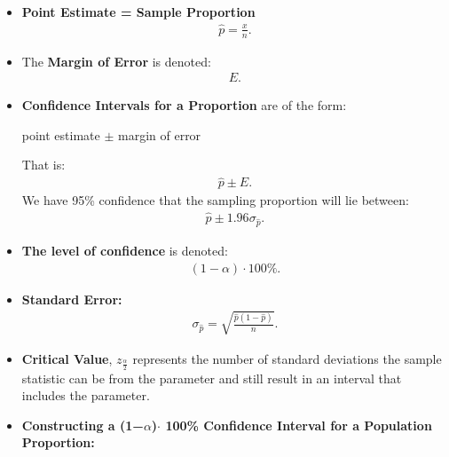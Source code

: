 \documentclass{report}
\begin{document}
    \begin{itemize}
        \item \textbf{Point Estimate = Sample Proportion}
            \begin{align*}
                \hat{p} = \frac{x}{n}
            .\end{align*}
        \item The \textbf{Margin of Error} is denoted:
            \begin{align*}
                E 
            .\end{align*}
        \item \textbf{Confidence Intervals for a Proportion} are of the form:
            \begin{center}
                point estimate $\pm $ margin of error
            \end{center}
            That is:
            \begin{align*}
               \hat{p} \pm E 
            .\end{align*}
            We have 95\% confidence that the sampling proportion will lie between:
            \begin{align*}
                \hat{p} \pm 1.96 \sigma_{\hat{p}}  
            .\end{align*}
        \item \textbf{The level of confidence} is denoted:
            \begin{align*}
                (1-\alpha) \cdot 100\%
            .\end{align*}
        \item \textbf{Standard Error:}
            \begin{align*}
                \sigma_{\hat{p}} = \sqrt{\frac{\hat{p}(1-\hat{p})}{n}}
            .\end{align*}
        \item \textbf{Critical Value}, $z_{\frac{\alpha}{2}} $ represents the number of standard deviations the sample statistic can be from the parameter and still result in an interval that includes the parameter.
            \bigbreak \noindent \bigbreak \noindent
        \item  \textbf{Constructing a (1−$\alpha $)$\cdot$ 100\% Confidence Interval for a Population Proportion:}
        \end{itemize}
\end{document}
